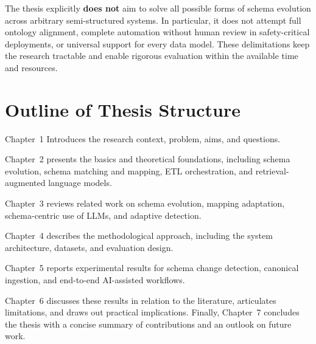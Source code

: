 The thesis explicitly \textbf{does not} aim to solve all possible forms of schema evolution across arbitrary semi-structured systems. In particular, it does not attempt full ontology alignment, complete automation without human review in safety-critical deployments, or universal support for every data model. These delimitations keep the research tractable and enable rigorous evaluation within the available time and resources.

\section{Outline of Thesis Structure}
\label{sec:intro-structure}

Chapter~1 Introduces the research context, problem, aims, and questions.

Chapter~2 presents the basics and theoretical foundations, including schema evolution, schema matching and mapping, ETL orchestration, and retrieval-augmented language models. 

Chapter~3 reviews related work on schema evolution, mapping adaptation, schema-centric use of LLMs, and adaptive detection. 

Chapter~4 describes the methodological approach, including the system architecture, datasets, and evaluation design. 

Chapter~5 reports experimental results for schema change detection, canonical ingestion, and end-to-end AI-assisted workflows. 

Chapter~6 discusses these results in relation to the literature, articulates limitations, and draws out practical implications. Finally, Chapter~7 concludes the thesis with a concise summary of contributions and an outlook on future work.